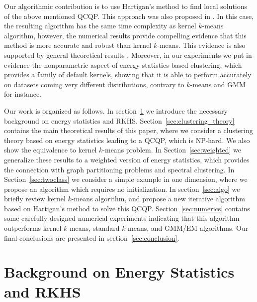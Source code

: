 \documentclass[aps,preprint,nofootinbib,floatfix]{revtex4-1}
\begin{document}
Our algorithmic contribution is to use Hartigan's method
\cite{Hartigan} to find local 
solutions of the above mentioned QCQP.
This approach was also proposed in \cite{Kgroups}.
In this case,
the resulting algorithm has the same
time complexity as kernel $k$-means algorithm, however, the numerical 
results provide compelling evidence that this method
is more accurate and robust than kernel $k$-means. This evidence
is also supported by general theoretical results \cite{Telgarsky,Slonin}.
Moreover, in our experiments we put in
evidence the nonparametric aspect of energy
statistics based clustering, which provides a family of 
default kernels, showing that
it is able to perform accurately on datasets coming very different 
distributions, contrary to $k$-means and GMM for instance.


Our work is organized as follows. In section~\ref{sec:background} we introduce
the necessary background on energy statistics and RKHS.
Section~\ref{sec:clustering_theory} contains the main theoretical 
results of this paper,
where we consider a clustering theory based on energy statistics leading
to a QCQP, which is NP-hard. We also show the equivalence to 
kernel $k$-means problem.
In Section~\ref{sec:weighted} we generalize these results to a weighted
version of energy statistics, which provides the connection with graph
partitioning problems and spectral clustering.
In Section~\ref{sec:twoclass} we consider a simple example in one dimension,
where we propose an algorithm which requires no initialization.
In section~\ref{sec:algo} we briefly review kernel $k$-means algorithm,
and propose a new iterative algorithm based on Hartigan's method
to solve this QCQP.
Section~\ref{sec:numerics} contains some carefully designed numerical
experiments indicating that this algorithm outperforms kernel
$k$-means, standard $k$-means, and GMM/EM algorithms.
Our final conclusions are presented in section~\ref{sec:conclusion}.


\section{Background on Energy Statistics and RKHS}
\label{sec:background}
\end{document}
